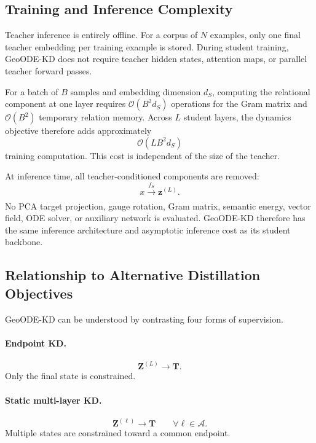 \documentclass[11pt]{article}
\begin{document}
\subsection{Training and Inference Complexity}\label{sec:complexity}

Teacher inference is entirely offline. For a corpus of $N$ examples, only
one final teacher embedding per training example is stored. During student
training, GeoODE-KD does not require teacher hidden states, attention maps,
or parallel teacher forward passes.

For a batch of $B$ samples and embedding dimension $d_S$, computing the
relational component at one layer requires
$\mathcal{O}(B^2d_S)$ operations for the Gram matrix and
$\mathcal{O}(B^2)$ temporary relation memory. Across $L$ student layers,
the dynamics objective therefore adds approximately
\begin{equation}
    \mathcal{O}(LB^2d_S)
\end{equation}
training computation. This cost is independent of the size of the teacher.

At inference time, all teacher-conditioned components are removed:
\begin{equation}
    x
    \xrightarrow[]{f_S}
    \mathbf{z}^{(L)}.
\end{equation}
No PCA target projection, gauge rotation, Gram matrix, semantic energy, vector field,
ODE solver, or auxiliary network is evaluated. GeoODE-KD therefore has
the same inference architecture and asymptotic inference cost as its
student backbone.


\subsection{Relationship to Alternative Distillation Objectives}\label{sec:comparison}

GeoODE-KD can be understood by contrasting four forms of supervision.

\paragraph{Endpoint KD.}
\begin{equation}
    \mathbf{Z}^{(L)}
    \rightarrow
    \mathbf{T}.
\end{equation}
Only the final state is constrained.

\paragraph{Static multi-layer KD.}
\begin{equation}
    \mathbf{Z}^{(\ell)}
    \rightarrow
    \mathbf{T}
    \qquad
    \forall \ell\in\mathcal{A}.
\end{equation}
Multiple states are constrained toward a common endpoint.
\end{document}
